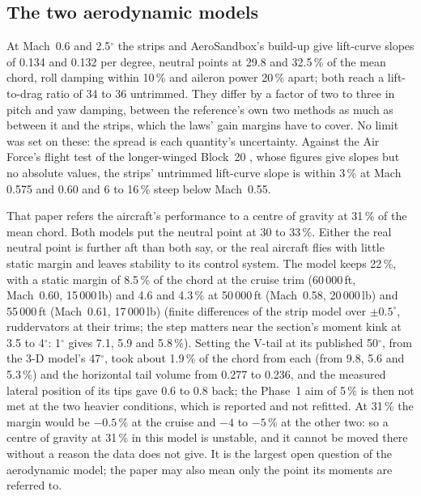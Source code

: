 \documentclass[10pt,a4paper,twocolumn]{article}
\begin{document}
\subsection{The two aerodynamic models}\label{sec:aero}
At Mach~0.6 and 2.5$^\circ$ the strips and AeroSandbox's build-up give lift-curve slopes of 0.134 and 0.132 per degree, neutral points at 29.8 and
32.5\,\% of the mean chord, roll damping within 10\,\% and aileron power 20\,\% apart; both reach a lift-to-drag ratio of 34 to 36 untrimmed. They
differ by a factor of two to three in pitch and yaw damping, between the reference's own two methods as much as between it and the strips, which the
laws' gain margins have to cover. No limit was set on these: the spread is each quantity's uncertainty. Against the Air Force's flight test of the
longer-winged Block~20 \cite{sfte}, whose figures give slopes but no absolute values, the strips' untrimmed lift-curve slope is within 3\,\% at Mach
0.575 and 0.60 and 6 to 16\,\% steep below Mach~0.55.

That paper refers the aircraft's performance to a centre of gravity at 31\,\% of the mean chord. Both models put the neutral point at 30 to 33\,\%.
Either the real neutral point is further aft than both say, or the real aircraft flies with little static margin and leaves stability to its
control system. The model keeps 22\,\%, with a static margin of 8.5\,\% of the chord at the cruise trim (60\,000\,ft, Mach~0.60, 15\,000\,lb) and 4.6 and 4.3\,\% at 50\,000\,ft (Mach~0.58, 20\,000\,lb) and 55\,000\,ft
(Mach~0.61, 17\,000\,lb) (finite differences of the strip model over $\pm0.5^\circ$, ruddervators at their trims; the step matters near the section's moment kink at 3.5 to 4$^\circ$: 1$^\circ$ gives 7.1, 5.9 and 5.8\,\%). Setting the V-tail at its published 50$^\circ$, from the 3-D model's 47$^\circ$, took about 1.9\,\% of the chord from each (from 9.8, 5.6 and 5.3\,\%) and the horizontal tail volume from 0.277 to 0.236, and the measured lateral position of its tips gave 0.6 to 0.8 back; the Phase~1 aim of 5\,\% is then not met at the two heavier conditions, which is reported and not refitted. At 31\,\% the margin would be $-0.5$\,\% at the cruise and $-4$ to $-5$\,\% at the other two: so a centre of gravity at 31\,\% in this model is unstable, and it cannot be moved there without a reason the data does not
give. It is the largest open question of the aerodynamic model; the paper may also mean only the point its moments are referred to.
\end{document}
